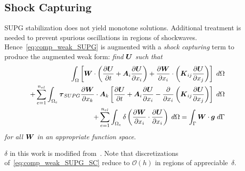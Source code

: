 \documentclass[compress,11pt]{beamer}
\begin{document}
\subsection{Shock Capturing}
\frame
{
  \small
  SUPG stabilization does not yield monotone solutions.  Additional treatment is needed to prevent spurious oscillations in regions of shockwaves.  Hence~\eqref{eq:comp_weak_SUPG} is augmented with a \emph{shock capturing} term to produce the augmented weak form: \emph{find ${\boldsymbol{U}}$ such that}
  \begin{eqnarray}
  \label{eq:comp_weak_SUPG_SC}
  \int_\Omega  \left[ {\boldsymbol{W}}\cdot\left({\frac{\partial{{\boldsymbol{U}}}}{\partial{t}}} + {\boldsymbol{A}}_i {\frac{\partial{{\boldsymbol{U}}}}{\partial{x_i}}} \right) + {\frac{\partial{{\boldsymbol{W}}}}{\partial{x_i}}} \cdot \left( {\boldsymbol{K}}_{ij} {\frac{\partial{{\boldsymbol{U}}}}{\partial{x_j}}} \right) \right] \; d\Omega \nonumber \\
  + \sum_{e=1}^{n_{el}} \int_{\Omega_e} {\boldsymbol{\tau}}_{SUPG} {\frac{\partial{{\boldsymbol{W}}}}{\partial{x_k}}}\cdot{\boldsymbol{A}}_k
  \left[ {\frac{\partial{{\boldsymbol{U}}}}{\partial{t}}} + {\boldsymbol{A}}_i {\frac{\partial{{\boldsymbol{U}}}}{\partial{x_i}}} - {\frac{\partial{}}{\partial{x_i}}} \left( {\boldsymbol{K}}_{ij} {\frac{\partial{{\boldsymbol{U}}}}{\partial{x_j}}} \right) \right] \; d\Omega  \nonumber \\
  + \sum_{e=1}^{n_{el}} \int_{\Omega_e} \delta \left({\frac{\partial{{\boldsymbol{W}}}}{\partial{x_i}}}\cdot{\frac{\partial{{\boldsymbol{U}}}}{\partial{x_i}}}\right)\; d\Omega
   = \int_\Gamma {\boldsymbol{W}}\cdot{\boldsymbol{g}} \; d\Gamma
\end{eqnarray}
  \emph{for all ${\boldsymbol{W}}$ in an appropriate function space}.
  \vspace{.5em}
  
  $\delta$ in this work is modified from~\cite{gjlebeau_thesis,skaliabadi_dissertation}.  Note that discretizations of~\eqref{eq:comp_weak_SUPG_SC} reduce to $\mathcal{O}(h)$ in regions of appreciable~$\delta$.
  \normalsize  
}
\end{document}
